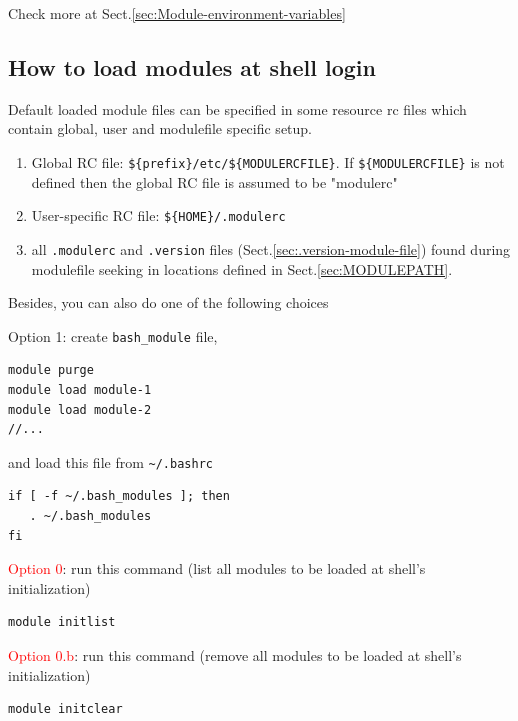 Check more at Sect.\ref{sec:Module-environment-variables}



\subsection{How to load modules at shell login}
\label{sec:module-load-at-shell-initialization}

Default loaded module files can be specified in some resource rc files which
contain global, user and modulefile specific setup.
\begin{enumerate}
  \item Global RC file: 
   \verb!${prefix}/etc/${MODULERCFILE}!. If \verb!${MODULERCFILE}! is not
   defined then the global RC file is assumed to be "modulerc"
  
  \item User-specific RC file: \verb!${HOME}/.modulerc!
  
  
  \item all \verb!.modulerc! and \verb!.version! files
  (Sect.\ref{sec:.version-module-file}) found during modulefile seeking in
  locations defined in Sect.\ref{sec:MODULEPATH}.
\end{enumerate}
Besides, you can also do one of the following choices

Option 1: create \verb!bash_module! file, 
\begin{verbatim}
module purge
module load module-1
module load module-2
//...
\end{verbatim}
and load this file from
\verb!~/.bashrc!
\begin{verbatim}
if [ -f ~/.bash_modules ]; then
   . ~/.bash_modules 
fi
\end{verbatim}

\textcolor{red}{Option 0}: run this command (list all modules to be loaded at
shell's initialization)
\begin{verbatim}
module initlist
\end{verbatim}

\textcolor{red}{Option 0.b}: run this command (remove all modules to be loaded
at shell's initialization)
\begin{verbatim}
module initclear
\end{verbatim}


